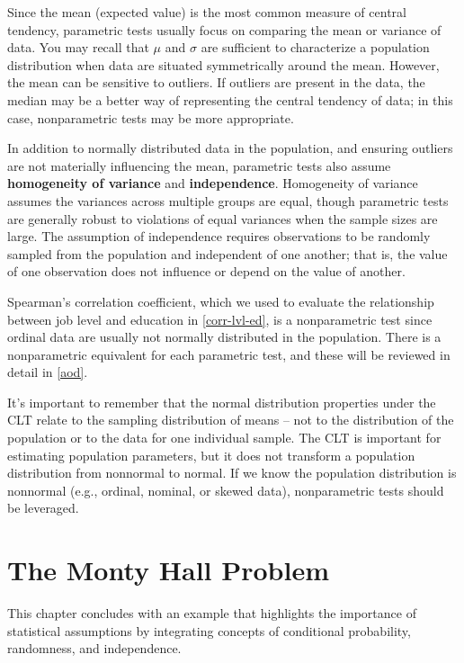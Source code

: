\documentclass[]{book}
\begin{document}
Since the mean (expected value) is the most common measure of central tendency, parametric tests usually focus on comparing the mean or variance of data. You may recall that \(\mu\) and \(\sigma\) are sufficient to characterize a population distribution when data are situated symmetrically around the mean. However, the mean can be sensitive to outliers. If outliers are present in the data, the median may be a better way of representing the central tendency of data; in this case, nonparametric tests may be more appropriate.

In addition to normally distributed data in the population, and ensuring outliers are not materially influencing the mean, parametric tests also assume \textbf{homogeneity of variance} and \textbf{independence}. Homogeneity of variance assumes the variances across multiple groups are equal, though parametric tests are generally robust to violations of equal variances when the sample sizes are large. The assumption of independence requires observations to be randomly sampled from the population and independent of one another; that is, the value of one observation does not influence or depend on the value of another.

Spearman's correlation coefficient, which we used to evaluate the relationship between job level and education in \ref{corr-lvl-ed}, is a nonparametric test since ordinal data are usually not normally distributed in the population. There is a nonparametric equivalent for each parametric test, and these will be reviewed in detail in \ref{aod}.

It's important to remember that the normal distribution properties under the CLT relate to the sampling distribution of means -- not to the distribution of the population or to the data for one individual sample. The CLT is important for estimating population parameters, but it does not transform a population distribution from nonnormal to normal. If we know the population distribution is nonnormal (e.g., ordinal, nominal, or skewed data), nonparametric tests should be leveraged.

\hypertarget{the-monty-hall-problem}{%
\section{The Monty Hall Problem}\label{the-monty-hall-problem}}

This chapter concludes with an example that highlights the importance of statistical assumptions by integrating concepts of conditional probability, randomness, and independence.
\end{document}
